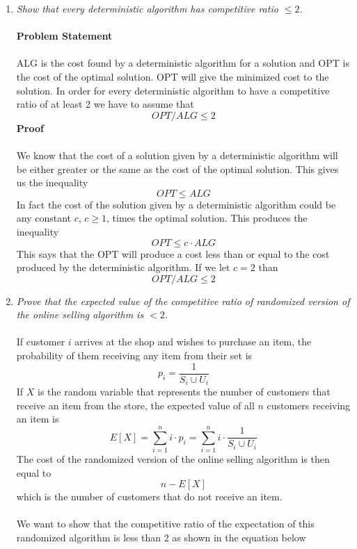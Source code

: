 \documentclass[12pt]{article}
\begin{document}
\begin{enumerate}
\begin{enumerate}
      \item \textit{Show that every deterministic algorithm has competitive
      ratio $\le 2$.}\\
      \\
      \textbf{Problem Statement}\\
      \\
      ALG is the cost found by a deterministic algorithm for a solution and
      OPT is the cost of the optimal solution.  OPT will give the minimized cost
      to the solution. In order for every deterministic algorithm to have a
      competitive ratio of at least 2 we have to assume that $$
      OPT/ALG \le 2
      $$
      \textbf{Proof}\\
      \\
      We know that the cost of a solution given by a deterministic algorithm
      will be either greater or the same as the cost of the optimal solution. 
      This gives us the inequality
      $$
      OPT \le ALG
      $$
      In fact the cost of the solution given by a deterministic algorithm could
      be any constant $c$, $c \ge 1$, times the optimal
      solution.
      This produces the inequality
      $$
      OPT \le c \cdot ALG
      $$
      This says that the OPT will produce a cost less than or equal to the cost
      produced by the deterministic algorithm.  If we let $c=2$ than
      $$
      OPT/ALG \le 2
      $$
      \item \textit{Prove that the expected value of the competitive ratio of
      randomized version of the online selling algorithm is $< 2$.}\\
      \\
      If customer $i$ arrives at the shop and wishes to purchase an item, the
      probability of them receiving any item from their set is 
      $$
      p_i = \frac{1}{S_i \cup U_i}
      $$
      If $X$ is the random variable that represents the number of customers
      that receive an item from the store, the expected value of all $n$
      customers receiving an item is 
      $$ 
      E[X] = \sum_{i=1}^{n} i \cdot p_i = \sum_{i=1}^{n} i \cdot \frac{1}{S_i
      \cup U_i} $$
      The cost of the randomized version of the online selling algorithm is then
      equal to
      $$
      n - E[X]
      $$
      which is the number of customers that do not receive an item.\\
      \\
      We want to show that the competitive ratio of the expectation of this
      randomized algorithm is less than 2 as shown in the equation below 

\end{enumerate}
\end{enumerate}
\end{document}
